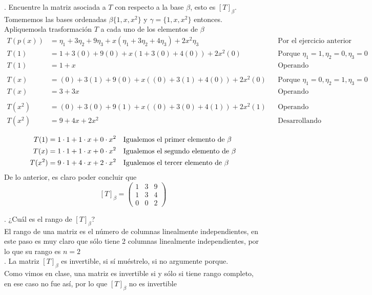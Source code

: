 \documentclass[letterpaper]{article}
\renewcommand{\*}{\cdot}
\newcommand{\T}{\begin{pmatrix}
		1 & 3 & 9 \\
		1 & 3 & 4 \\
		0 & 0 & 2 
\end{pmatrix} }
\theoremstyle{definition}
\begin{document}
. Encuentre la matriz asociada a $T$ con respecto a la base $\beta$, esto es $[T]_{\beta}$.
Tomememos las bases ordenadas $ \beta\{ 1,x,x^2 \} $ y $ \gamma = \{ 1, x, x^2 \} $ entonces. Apliquemosla trasformación $ T $ a cada uno de los elementos de $ \beta $
\begin{align*}
	 T(p(x)) &= \eta_1 + 3\eta_2 + 9\eta_3 + x(\eta_1 + 3 \eta_2 + 4 \eta_3) + 2 x^2\eta_3 && \text{Por el ejercicio anterior}\\
	 T(1) &= 1 + 3(0) + 9(0) + x(1 + 3 (0) + 4 (0)) + 2 x^2(0) && \text{Porque }\eta_1 = 1, \eta_2 = 0, \eta_3 = 0 \\
	 T(1) &= 1 + x && \text{Operando }\\
	 \\
	 T(x) &= (0) + 3(1) + 9(0) + x((0) + 3 (1) + 4 (0)) + 2 x^2(0) && \text{Porque }\eta_1 = 0, \eta_2 = 1, \eta_3 = 0 \\
	 T(x) &= 3 + 3x && \text{Operando }\\
	 \\
	 T(x^2) &= (0) + 3(0) + 9(1) + x((0) + 3 (0) + 4 (1)) + 2 x^2(1) && \text{Operando }\\
	 T(x^2) &= 9+ 4x + 2x^2 && \text{Desarrollando }\\
\end{align*}
\begin{align*}
	T(1) &= 1\* 1 + 1\*x + 0\*x^2 && \text{Igualemos el primer elemento de $ \beta $}\\
	T(x) &=1\* 1 + 1\*x + 0\*x^2 && \text{Igualemos el segundo elemento de $ \beta $}\\
	T(x^2) &= 9\* 1 + 4\*x + 2\*x^2 && \text{Igualemos el tercer elemento de $ \beta $}\\
\end{align*}
De lo anterior, es claro poder concluir que 
\[ [T]_{\beta} = \T \]



. ¿Cuál es el rango de $[T]_{\beta}$?\\
El rango de una matriz es el número de columnas linealmente independientes, en este paso es muy claro que sólo tiene 2 columnas linealmente independientes, por lo que su rango es $ n = 2 $\\


. La matriz $[T]_{\beta}$ es invertible, si sí muéstrelo, si no argumente porque.\\
Como vimos en clase, una matriz es invertible si y sólo si tiene rango completo, en ese caso no fue así, por lo que $ [T]_{\beta} $ no es invertible\\
\end{document}
